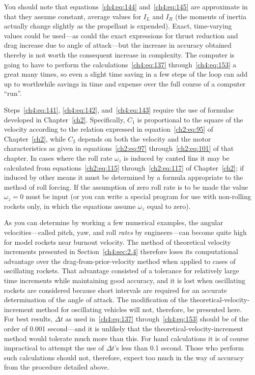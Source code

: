 You should note that equations~\eqref{ch4:eq:144} and~\eqref{ch4:eq:145} are approximate in that
they assume constant, average values for $I_L$ and $I_R$ (the moments of inertia actually change
slightly as the propellant is expended). Exact, time-varying values could be used---as could the
exact expressions for thrust reduction and drag increase due to angle of attack---but the increase
in accuracy obtained thereby is not worth the consequent increase in complexity. The computer is
going to have to perform the calculations~\eqref{ch4:eq:137} through~\eqref{ch4:eq:153} a great
many times, so even a slight time saving in a few steps of the loop can add up to worthwhile
savings in time and expense over the full course of a computer ``run''.

Steps~\eqref{ch4:eq:141}, \eqref{ch4:eq:142}, and~\eqref{ch4:eq:143} require the use of formulae
developed in Chapter~\ref{ch2}. Specifically, $C_1$ is proportional to the square of the velocity
according to the relation expressed in equation~\eqref{ch2:eq:95} of Chapter~\ref{ch2}, while
$C_2$ depends on both the velocity and the motor characteristics as given in
equations~\eqref{ch2:eq:97} through~\eqref{ch2:eq:101} of that chapter. In cases where the roll
rate $\omega_z$ is induced by canted fins it may be calculated from equations~\eqref{ch2:eq:115}
through~\eqref{ch2:eq:117} of Chapter~\ref{ch2}; if induced by other means it must be determined
by a formula appropriate to the method of roll forcing. If the assumption of zero roll rate is to
be made the value $\omega_z = 0$ must be input (or you can write a special program for use with
non-rolling rockets only, in which the equations assume $\omega_z$ equal to zero).

As you can determine by working a few numerical examples, the angular velocities---called pitch,
yaw, and roll \emph{rates} by engineers---can become quite high for model rockets near burnout
velocity. The method of theoretical velocity increments presented in Section~\ref{ch4:sec:2.4}
therefore loses its computational advantage over the drag-from-prior-velocity method when applied
to cases of oscillating rockets. That advantage consisted of a tolerance for relatively large time
increments while maintaining good accuracy, and it is lost when oscillating rockets are considered
because short intervals are required for an accurate determination of the angle of attack. The
modification of the theoretical-velocity-increment method for oscillating vehicles will not,
therefore, be presented here. For best results, $\Delta t$ as used in~\eqref{ch4:eq:137}
through~\eqref{ch4:eq:153} should be of the order of 0.001 second---and it is unlikely that the
theoretical-velocity-increment method would tolerate much more than this. For hand calculations it
is of course impractical to attempt the use of $\Delta t$'s less than 0.1 second. Those who perform
such calculations should not, therefore, expect too much in the way of accuracy from the procedure
detailed above.


